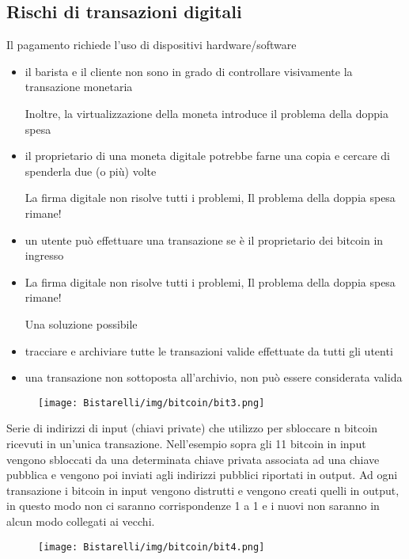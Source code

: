 \subsection{Rischi di transazioni digitali}
Il pagamento richiede l'uso di dispositivi hardware/software
\begin{itemize}
    \item il barista e il cliente non sono in grado di controllare visivamente la transazione monetaria 
    
    Inoltre, la virtualizzazione della moneta introduce il problema della doppia spesa
    
    \item il proprietario di una moneta digitale potrebbe farne una copia e cercare di spenderla due (o più) volte
     
    La firma digitale non risolve tutti i problemi, Il problema della doppia spesa rimane!
    
    \item un utente può effettuare una transazione se è il proprietario dei bitcoin in ingresso
    
    \item La firma digitale non risolve tutti i problemi, Il problema della doppia spesa rimane!
    
    Una soluzione possibile
    
    \item tracciare e archiviare tutte le transazioni valide effettuate da tutti gli utenti
    
    \item una transazione non sottoposta all'archivio, non può essere considerata valida
\end{itemize}
\begin{figure}[H]
	\centering
    \texttt{[image: Bistarelli/img/bitcoin/bit3.png]}
\end{figure}

Serie di indirizzi di input (chiavi private) che utilizzo per sbloccare n bitcoin ricevuti in un’unica transazione.
Nell’esempio sopra gli 11 bitcoin in input vengono sbloccati da una determinata chiave privata associata ad una
chiave pubblica e vengono poi inviati agli indirizzi pubblici riportati in output. Ad ogni transazione i bitcoin in input vengono distrutti e vengono creati quelli in output, in questo modo non ci saranno corrispondenze 1 a 1 e i nuovi
non saranno in alcun modo collegati ai vecchi.

\begin{figure}[H]
	\centering
    \texttt{[image: Bistarelli/img/bitcoin/bit4.png]}
\end{figure}

